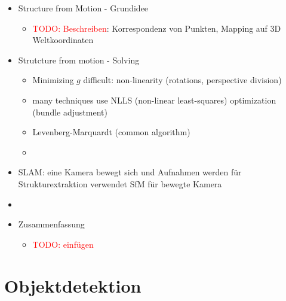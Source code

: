 \documentclass{report}
\newcommand{\todo}[2][red]{\textcolor{#1}{TODO: #2}}
\begin{document}
\begin{itemize}
		\item Structure from Motion - Grundidee
		\begin{itemize}
			\item \todo{Beschreiben}: Korrespondenz von Punkten, Mapping auf 3D Weltkoordinaten
		\end{itemize}
	
		\item Strutcture from motion - Solving
		\begin{itemize}
			\item Minimizing $g$ difficult: non-linearity (rotations, perspective division)
			\item many techniques use NLLS (non-linear least-squares) optimization (bundle adjustment)
			\item Levenberg-Marquardt (common algorithm)
			\item 
		\end{itemize}
	
		\item SLAM: eine Kamera bewegt sich und Aufnahmen werden für Strukturextraktion verwendet
		\newline SfM für bewegte Kamera
		\item 
		\item Zusammenfassung
		\begin{itemize}
			\item \todo{einfügen}
		\end{itemize}
	
	\end{itemize}
	\newpage
	
	\section{Objektdetektion}
	
\end{document}
